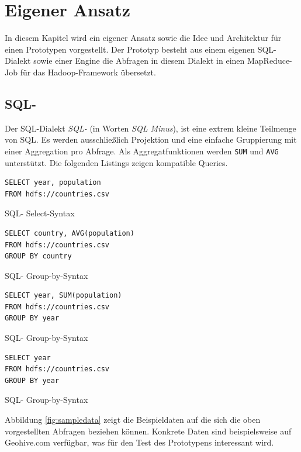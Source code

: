 \documentclass[a4paper]{article}
\begin{document}
\newpage
\section{Eigener Ansatz}
\label{sec:approach}

In diesem Kapitel wird ein eigener Ansatz sowie die Idee und Architektur für einen Prototypen vorgestellt. Der Prototyp besteht aus einem eigenen SQL-Dialekt sowie einer Engine die Abfragen in diesem Dialekt in einen MapReduce-Job für das Hadoop-Framework übersetzt.

\subsection{SQL-}
\label{sec:sqlminus}
Der SQL-Dialekt \textit{SQL-} (in Worten \textit{SQL Minus}), ist eine extrem kleine Teilmenge von SQL. Es werden ausschließlich Projektion und eine einfache Gruppierung mit einer Aggregation pro Abfrage. Als Aggregatfunktionen werden \texttt{SUM} und \texttt{AVG} unterstützt. Die folgenden Listings zeigen kompatible Queries. 

\begin{listing}[H]
\begin{verbatim}
SELECT year, population
FROM hdfs://countries.csv
\end{verbatim}
\caption{SQL- Select-Syntax}
\end{listing}

\begin{listing}[H]
\begin{verbatim}
SELECT country, AVG(population)
FROM hdfs://countries.csv
GROUP BY country
\end{verbatim}
\caption{SQL- Group-by-Syntax}
\end{listing}

\begin{listing}[H]
\begin{verbatim}
SELECT year, SUM(population)
FROM hdfs://countries.csv
GROUP BY year
\end{verbatim}
\caption{SQL- Group-by-Syntax}
\end{listing}

\begin{listing}[H]
\begin{verbatim}
SELECT year
FROM hdfs://countries.csv
GROUP BY year
\end{verbatim}
\caption{SQL- Group-by-Syntax}
\end{listing}

Abbildung \ref{fig:sampledata} zeigt die Beispieldaten auf die sich die oben vorgestellten Abfragen beziehen können. Konkrete Daten sind beispielsweise auf Geohive.com \cite{GeoHive} verfügbar, was für den Test des Prototypens interessant wird.
\end{document}
